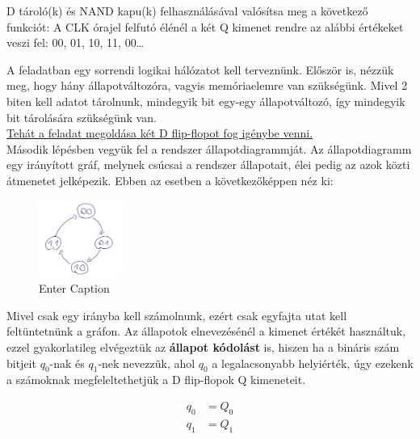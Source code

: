 \begin{example2}

D tároló(k) és NAND kapu(k) felhasználásával valósítsa meg a következő funkciót:
A CLK órajel felfutó élénél a két Q kimenet rendre az alábbi értékeket veszi fel: 00, 01, 10, 11, 00…
\end{example2}

A feladatban egy sorrendi logikai hálózatot kell terveznünk. Először is, nézzük meg, hogy hány állapotváltozóra, vagyis memóriaelemre van szükségünk. Mivel 2 biten kell adatot tárolnunk, mindegyik bit egy-egy állapotváltozó, így mindegyik bit tárolására szükségünk van. \\
\underline{Tehát a feladat megoldása két D flip-flopot fog igénybe venni.} \\


Második lépésben vegyük fel a rendszer állapotdiagrammját. Az állapotdiagramm egy irányított gráf, melynek csúcsai a rendszer állapotait, élei pedig az azok közti átmenetet jelképezik. Ebben az esetben a következőképpen néz ki:

\begin{figure}{}
    \centering
    \includegraphics[width=0.24\textwidth]{Figures//tmp/sd_counter.png}
    \caption{Enter Caption}
    \label{fig:enter-label}
\end{figure}

Mivel csak egy irányba kell számolnunk, ezért csak egyfajta utat kell feltüntetnünk a gráfon. Az állapotok elnevezésénél a kimenet értékét használtuk, ezzel gyakorlatileg elvégeztük az \textbf{állapot kódolást} is, hiszen ha a bináris szám bitjeit $q_0$-nak és $q_1$-nek nevezzük, ahol $q_0$ a legalacsonyabb helyiérték, úgy ezekenk a számoknak megfeleltethetjük a D flip-flopok Q kimeneteit.

\begin{equation}
\begin{aligned}{}
    q_0 &= Q_0 \\
    q_1 &= Q_1 \\
\end{aligned}
\end{equation}

